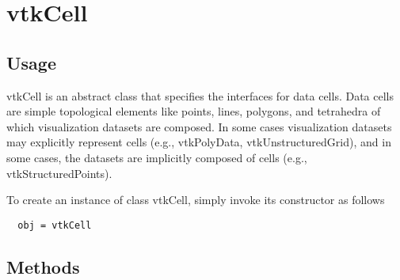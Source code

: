 \section{vtkCell}

\subsection{Usage}

 vtkCell is an abstract class that specifies the interfaces for data cells.
 Data cells are simple topological elements like points, lines, polygons, 
 and tetrahedra of which visualization datasets are composed. In some 
 cases visualization datasets may explicitly represent cells (e.g., 
 vtkPolyData, vtkUnstructuredGrid), and in some cases, the datasets are 
 implicitly composed of cells (e.g., vtkStructuredPoints).


To create an instance of class vtkCell, simply
invoke its constructor as follows
\begin{verbatim}
  obj = vtkCell
\end{verbatim}
\subsection{Methods}


